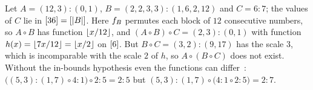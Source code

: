 \begin{example}[associativity]\label{ex:assoc}
Let $A=(12,3):(0,1)$, $B=(2,2,3,3):(1,6,2,12)$ and $C=6:7$; the values of $C$ lie in
$[36]=[|B|]$. Here $f_{B}$ permutes each block of $12$ consecutive numbers, so
$A\circ B$ has function $\left\lfloor x/12 \right\rfloor$, and $(A\circ B)\circ C=(2,3):(0,1)$ with function
$h(x)=\left\lfloor 7x/12 \right\rfloor=\left\lfloor x/2 \right\rfloor$ on $[6]$. But $B\circ C=(3,2):(9,17)$ has the scale $3$,
which is incomparable with the scale $2$ of $h$, so $A\circ(B\circ C)$ does not exist. Without
the in-bounds hypothesis even the functions can differ~\cite{cecka2026}:
$\bigl((5,3):(1,7)\circ4:1\bigr)\circ2:5=2:5$ but $(5,3):(1,7)\circ\bigl(4:1\circ2:5\bigr)=2:7$.
\end{example}
